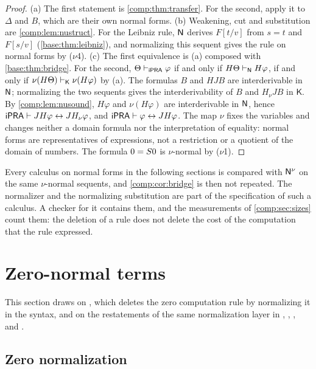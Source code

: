 \begin{proof}
(a) The first statement is \cref{comp:thm:transfer}. For the second, apply
it to $\Delta$ and $B$, which are their own normal forms. (b) Weakening, cut
and substitution are \cref{comp:lem:nustruct}. For the Leibniz rule,
$\mathsf{N}$ derives $F[t/v]$ from $s=t$ and $F[s/v]$
(\cref{base:thm:leibniz}), and normalizing this sequent gives the rule on
normal forms by ($\nu$4). (c) The first equivalence is (a) composed with
\cref{base:thm:bridge}. For the second, $\Theta\vdash_{\mathsf{iPRA}}\varphi$ if
and only if $H\Theta\vdash_{\mathsf{N}}H\varphi$, if and only if
$\nu(H\Theta)\vdash_{\mathsf K}\nu(H\varphi)$ by (a). The formulas $B$ and
$HJB$ are interderivable in $\mathsf{N}$; normalizing the two sequents gives the
interderivability of $B$ and $H_{\nu}JB$ in $\mathsf{K}$. By
\cref{comp:lem:nusound}, $H\varphi$ and $\nu(H\varphi)$ are interderivable
in $\mathsf{N}$, hence $\mathsf{iPRA}\vdash JH\varphi\leftrightarrow JH_{\nu}\varphi$,
and $\mathsf{iPRA}\vdash\varphi\leftrightarrow JH\varphi$. The map $\nu$ fixes the
variables and changes neither a domain formula nor the interpretation of
equality: normal forms are representatives of expressions, not a restriction
or a quotient of the domain of numbers. The formula $0=S0$ is
$\nu$-normal by ($\nu$1).
\end{proof}

Every calculus on normal forms in the following sections is compared with
$\mathsf{N}^{\nu}$ on the same $\nu$-normal sequents, and \cref{comp:cor:bridge}
is then not repeated. The normalizer and the normalizing substitution are
part of the specification of such a calculus. A checker for it contains
them, and the measurements of \cref{comp:sec:sizes} count them: the deletion
of a rule does not delete the cost of the computation that the rule
expressed.

\section{Zero-normal terms}
\label{comp:sec:zero}

This section draws on , which deletes the zero computation
rule by normalizing it in the syntax, and on the restatements of the same
normalization layer in ,
, ,
 and .

\subsection{Zero normalization}

